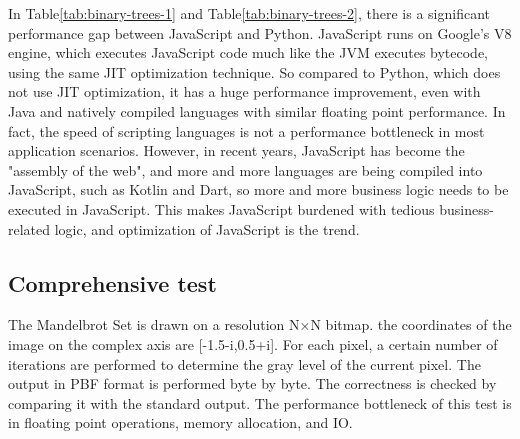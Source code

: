 In Table\ref{tab:binary-trees-1} and Table\ref{tab:binary-trees-2},
there is a significant performance gap between JavaScript and Python. JavaScript runs on Google's V8 engine, which executes JavaScript code much like the JVM executes bytecode, using the same JIT optimization technique. So compared to Python, which does not use JIT optimization, it has a huge performance improvement, even with Java and natively compiled languages with similar floating point performance. In fact, the speed of scripting languages is not a performance bottleneck in most application scenarios. However, in recent years, JavaScript has become the "assembly of the web", and more and more languages are being compiled into JavaScript, such as Kotlin and Dart, so more and more business logic needs to be executed in JavaScript. This makes JavaScript burdened with tedious business-related logic, and optimization of JavaScript is the trend.

\subsection{Comprehensive test}

The Mandelbrot Set is drawn on a resolution N×N bitmap. the coordinates of the image on the complex axis are [-1.5-i,0.5+i]. For each pixel, a certain number of iterations are performed to determine the gray level of the current pixel. The output in PBF format is performed byte by byte. The correctness is checked by comparing it with the standard output. The performance bottleneck of this test is in floating point operations, memory allocation, and IO.

